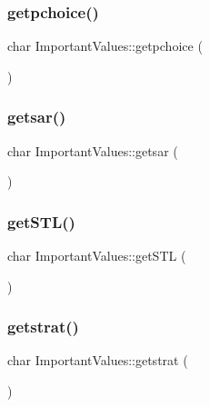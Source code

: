 \subsubsection{\texorpdfstring{getpchoice()}{getpchoice()}}
{\footnotesize\ttfamily char Important\+Values\+::getpchoice (\begin{DoxyParamCaption}{ }\end{DoxyParamCaption})\hspace{0.3cm}{\ttfamily [inline]}}

\mbox{\label{class_important_values_af4881f8a834e3a2e82c5923764044387}} 
\subsubsection{\texorpdfstring{getsar()}{getsar()}}
{\footnotesize\ttfamily char Important\+Values\+::getsar (\begin{DoxyParamCaption}{ }\end{DoxyParamCaption})\hspace{0.3cm}{\ttfamily [inline]}}

\mbox{\label{class_important_values_a97db94c67dfefb6f0e10fd447e365a38}} 
\subsubsection{\texorpdfstring{getSTL()}{getSTL()}}
{\footnotesize\ttfamily char Important\+Values\+::get\+S\+TL (\begin{DoxyParamCaption}{ }\end{DoxyParamCaption})\hspace{0.3cm}{\ttfamily [inline]}}

\mbox{\label{class_important_values_a56f8ed4ad80031911f3f73f92e7072d0}} 
\subsubsection{\texorpdfstring{getstrat()}{getstrat()}}
{\footnotesize\ttfamily char Important\+Values\+::getstrat (\begin{DoxyParamCaption}{ }\end{DoxyParamCaption})\hspace{0.3cm}{\ttfamily [inline]}}

